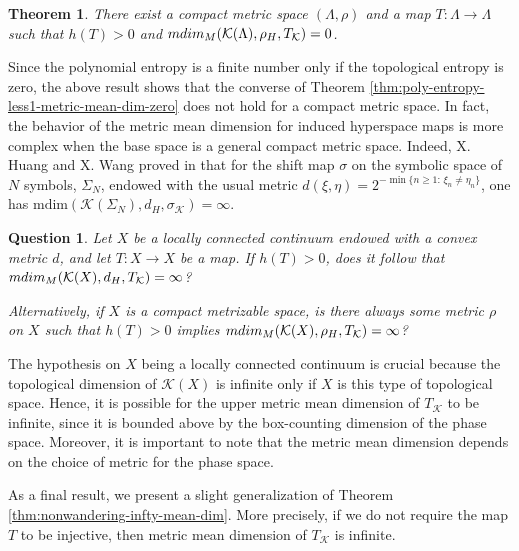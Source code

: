 \documentclass[sn-mathphys-num]{sn-jnl}%
\theoremstyle{thmstyleone}%
\newtheorem{theorem}{Theorem}%
\newtheorem*{question*}{Question}
\theoremstyle{thmstyletwo}%
\theoremstyle{thmstylethree}%
\newcommand*\induce[1]{#1_\mathcal{K}}
\newcommand*\hyp[1]{\mathcal{#1}}
\begin{document}
\begin{theorem}\label{thm:existence-compact-space-pos-entropy-zero-metric-mean-dim}
    There exist a compact metric space $(\Lambda, \rho)$ and a map $T: \Lambda \to \Lambda$ such that $h(T) > 0$ and $\emph{mdim}_M(\hyp{K}(\Lambda), \rho_H, \induce{T}) = 0$.\\
\end{theorem}

Since the polynomial entropy is a finite number only if the topological entropy is zero, the above result shows that the converse of Theorem \ref{thm:poly-entropy-less1-metric-mean-dim-zero} does not hold for a compact metric space. In fact, the behavior of the metric mean dimension for induced hyperspace maps is more complex when the base space is a general compact metric space. Indeed, X. Huang and X. Wang proved in \cite{huang_wang_2022} that for the shift map $\sigma$ on the symbolic space of $N$ symbols, $\Sigma_N$, endowed with the usual metric $d(\xi,\eta)=2^{-\min\{n\ge1:\,\xi_n\ne \eta_n\}}$, one has $\text{mdim}(\hyp{K}(\Sigma_N),d_H,\induce{\sigma})=\infty$.\\


\begin{question*}
    Let $X$ be a locally connected continuum endowed with a convex metric $d$, and let $T: X \to X$ be a map. If $h(T) > 0$, does it follow that $\emph{mdim}_M(\hyp{K}(X), d_H, \induce{T}) = \infty$? 
    
    Alternatively, if $X$ is a compact metrizable space, is there always some metric $\rho$ on $X$ such that $h(T) > 0$ implies $\emph{mdim}_M(\hyp{K}(X), \rho_H, \induce{T}) = \infty$?\\
\end{question*}

The hypothesis on $X$ being a locally connected continuum is crucial because the topological dimension of $\hyp{K}(X)$ is infinite only if $X$ is this type of topological space. Hence, it is possible for the upper metric mean dimension of $\induce{T}$ to be infinite, since it is bounded above by the box-counting dimension of the phase space. Moreover, it is important to note that the metric mean dimension depends on the choice of metric for the phase space.

As a final result, we present a slight generalization of Theorem \ref{thm:nonwandering-infty-mean-dim}. More precisely, if we do not require the map $T$ to be injective, then metric mean dimension of $\induce{T}$ is infinite.\\
\end{document}
